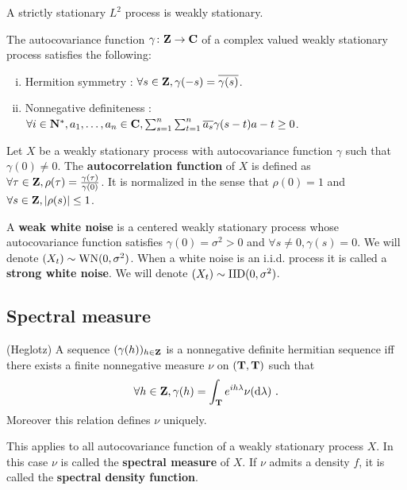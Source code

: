 	A strictly stationary $L^2$ process is weakly stationary.

	\begin{pop}
		The autocovariance function $\gamma \colon \mathbf{Z} \to \mathbf{C}$ of a complex valued weakly stationary process satisfies the following:
		\begin{enumerate}[(i)]
			\item Hermition symmetry : $\forall s \in \mathbf{Z}, \gamma(-s) = \overline{\gamma(s)}$.
			\item Nonnegative definiteness : $\forall i \in \mathbf{N}^*, a_1, \ldots, a_n \in \mathbf{C}, \sum_{s = 1}^n \sum_{t = 1}^n \overline{a_s} \gamma(s - t) a-t \geq 0$.
		\end{enumerate}
	\end{pop}

	\begin{defn}
		Let $X$ be a weakly stationary process with autocovariance function $\gamma$ such that $\gamma(0) \neq 0$.
		The \textbf{autocorrelation function} of $X$ is defined as $\forall \tau \in \mathbf{Z}, \rho(\tau) = \frac{\gamma(\tau)}{\gamma(0)}$.
		It is normalized in the sense that $\rho(0) = 1$ and $\forall s \in \mathbf{Z}, \left\lvert\rho(s)\right\rvert \leq 1$.
	\end{defn}

	\begin{defn}
		A \textbf{weak white noise} is a centered weakly stationary process whose autocovariance function satisfies $\gamma(0) = \sigma^2 > 0$ and $\forall s \neq 0, \gamma(s) = 0$.
		We will denote $(X_t) \sim \operatorname{WN}(0,\sigma^2)$.
		When a white noise is an i.i.d. process it is called a \textbf{strong white noise}.
		We will denote $(X_t) \sim \operatorname{IID}(0,\sigma^2)$.
	\end{defn}


\subsection{Spectral measure}

	\begin{thm}(Heglotz)
		A sequence $(\gamma(h))_{h \in \mathbf{Z}}$ is a nonnegative definite hermitian sequence iff there exists a finite nonnegative measure $\nu$ on $(\mathbf{T},\mathcal{\mathbf{T}})$ such that
		$$\forall h \in \mathbf{Z}, \gamma(h) = \int_{\mathbf{T}} e^{ih \lambda} \nu(\mathop{}\mathopen{}\mathrm{d} \lambda)\ .$$
		Moreover this relation defines $\nu$ uniquely.
	\end{thm}

	\begin{rem}
		This applies to all autocovariance function of a weakly stationary process $X$.
		In this case $\nu$ is called the \textbf{spectral measure} of $X$.
		If $\nu$ admits a density $f$, it is called the \textbf{spectral density function}.
	\end{rem}

